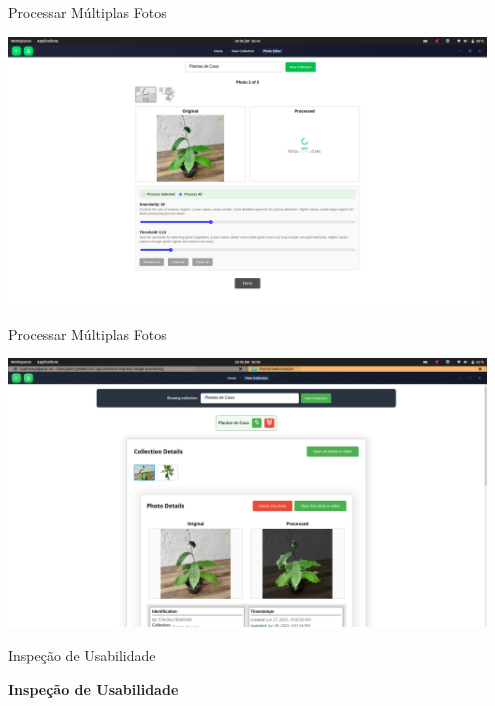 \documentclass[landscape, 12pt]{beamer}
\begin{document}
\begin{frame}{Processar Múltiplas Fotos}
    \begin{center}
        \includegraphics[width=0.95\textwidth]{../figures/screens/uc012/Screenshot from 2025-06-28 16-45-48.png} 
    \end{center}
\end{frame}

\begin{frame}{Processar Múltiplas Fotos}
    \begin{center}
        \includegraphics[width=0.95\textwidth]{../figures/screens/uc012/Screenshot from 2025-06-28 16-58-13.png}
    \end{center}
\end{frame}

\begin{frame}{Inspeção de Usabilidade}
    \begin{center}
        \textbf{Inspeção de Usabilidade}
    \end{center}
\end{frame}
\end{document}
